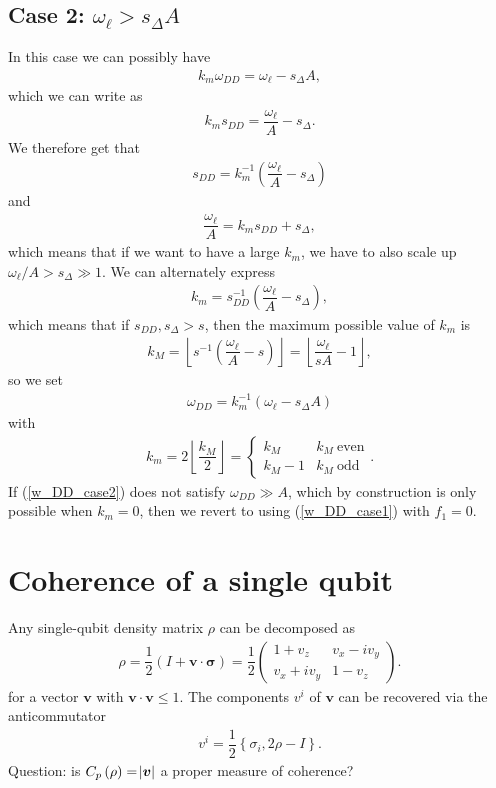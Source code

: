 \documentclass[11pt]{article}
\renewcommand{\t}{\text} %
\newcommand{\f}[2]{\dfrac{#1}{#2}} %
\newcommand{\p}[1]{\left(#1\right)} %
\renewcommand{\set}[1]{\left\{#1\right\}} %
\renewcommand{\v}{\bm} %
\renewcommand{\c}{\cdot} %
\renewcommand{\l}{\ell} %
\newcommand{\m}[1]{\begin{pmatrix}#1\end{pmatrix}} %
\newcommand{\floor}[1]{\left\lfloor{#1}\right\rfloor}
\begin{document}
\subsection*{Case 2: $\omega_\l > s_\Delta A$}
In this case we can possibly have
\begin{align}
  k_m\omega_{DD}=\omega_\l-s_\Delta A,
\end{align}
which we can write as
\begin{align}
  k_m s_{DD}=\f{\omega_\l}{A}-s_\Delta.
\end{align}
We therefore get that
\begin{align}
  s_{DD}=k_m^{-1}\p{\f{\omega_\l}{A}-s_\Delta}
\end{align}
and
\begin{align}
  \f{\omega_\l}{A}=k_m s_{DD}+s_\Delta,
\end{align}
which means that if we want to have a large $k_m$, we have to also
scale up $\omega_\l/A>s_\Delta\gg1$. We can alternately express
\begin{align}
  k_m=s_{DD}^{-1}\p{\f{\omega_\l}{A}-s_\Delta},
\end{align}
which means that if $s_{DD},s_\Delta>s$, then the maximum possible
value of $k_m$ is
\begin{align}
  k_M=\floor{s^{-1}\p{\f{\omega_\l}{A}-s}}
  =\floor{\f{\omega_\l}{sA}-1},
  \label{k_M}
\end{align}
so we set
\begin{align}
  \omega_{DD}=k_m^{-1}\p{\omega_\l-s_\Delta A}
  \label{w_DD_case2}
\end{align}
with
\begin{align}
  k_m=2\floor{\f{k_M}2}=\left\{
    \begin{array}{ll}
      k_M & k_M~\t{even} \\
      k_M-1 & k_M~\t{odd}
    \end{array}\right..
\end{align}
If (\ref{w_DD_case2}) does not satisfy $\omega_{DD}\gg A$, which by
construction is only possible when $k_m=0$, then we revert to using
(\ref{w_DD_case1}) with $f_1=0$.


\newpage

\section*{Coherence of a single qubit}

Any single-qubit density matrix $\rho$ can be decomposed as
\begin{align}
  \rho=\f12\p{I+\v v\c\v\sigma}=\f12\m{1+v_z&v_x-iv_y\\v_x+iv_y&1-v_z}.
\end{align}
for a vector $\v v$ with $\v v\c\v v\le 1$. The components $v^i$ of
$\v v$ can be recovered via the anticommutator
\begin{align}
  v^i=\f12\set{\sigma_i,2\rho-I}.
\end{align}
Question: is $C_p\p\rho=\abs{\v v}$ a proper measure of
coherence?
\end{document}
